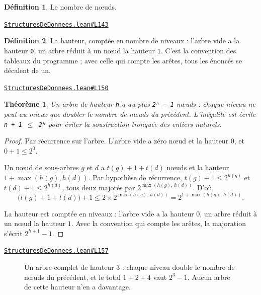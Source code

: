 \documentclass[11pt,a4paper]{article}
\theoremstyle{definition}
\newtheorem{definition}{Définition}
\theoremstyle{plain}
\newtheorem{theoreme}{Théorème}
\newcommand{\source}[2]{\par\smallskip\noindent\hfill{\footnotesize\href{#1}{\texttt{#2}}}\par\smallskip}
\begin{document}
\begin{definition}
Le nombre de nœuds.
\end{definition}
\source{https://github.com/Commutator-IO/learn-lean/blob/main/courses/02-lycee/11-informatique-nsi/StructuresDeDonnees.lean\#L143}{StructuresDeDonnees.lean\#L143}

\begin{definition}
La hauteur, comptée en nombre de niveaux : l'arbre vide a la hauteur \texttt{0}, un arbre
réduit à un nœud la hauteur \texttt{1}. C'est la convention des tableaux du programme ; avec
celle qui compte les arêtes, tous les énoncés se décalent de un.
\end{definition}
\source{https://github.com/Commutator-IO/learn-lean/blob/main/courses/02-lycee/11-informatique-nsi/StructuresDeDonnees.lean\#L150}{StructuresDeDonnees.lean\#L150}

\begin{theoreme}
Un arbre de hauteur \texttt{h} a au plus \texttt{2ʰ − 1} nœuds : chaque niveau ne peut au mieux
que doubler le nombre de nœuds du précédent. L'inégalité est écrite \texttt{n + 1 \(\le\) 2ʰ} pour
éviter la soustraction tronquée des entiers naturels.
\end{theoreme}
\begin{proof}
Par récurrence sur l'arbre. L'arbre vide a zéro nœud et la hauteur \(0\), et
\(0 + 1 \le 2^0\).

Un nœud de sous-arbres \(g\) et \(d\) a \(t(g) + 1 + t(d)\) nœuds et la hauteur
\(1 + \max(h(g), h(d))\). Par hypothèse de récurrence, \(t(g) + 1 \le 2^{h(g)}\) et
\(t(d) + 1 \le 2^{h(d)}\), tous deux majorés par \(2^{\max(h(g),\, h(d))}\). D'où
\[ \bigl(t(g) + 1 + t(d)\bigr) + 1 \le 2 \times 2^{\max(h(g),\, h(d))}
   = 2^{1 + \max(h(g),\, h(d))} . \]

La hauteur est comptée en niveaux : l'arbre vide a la hauteur \(0\), un arbre réduit à
un nœud la hauteur \(1\). Avec la convention qui compte les arêtes, la majoration
s'écrit \(2^{h+1} - 1\).
\end{proof}
\source{https://github.com/Commutator-IO/learn-lean/blob/main/courses/02-lycee/11-informatique-nsi/StructuresDeDonnees.lean\#L157}{StructuresDeDonnees.lean\#L157}

\begin{figure}[h]
\centering

\caption{Un arbre complet de hauteur $3$ : chaque niveau double le nombre de nœuds du précédent, et le total $1 + 2 + 4$ vaut $2^3 - 1$. Aucun arbre de cette hauteur n'en a davantage.}
\end{figure}
\end{document}
